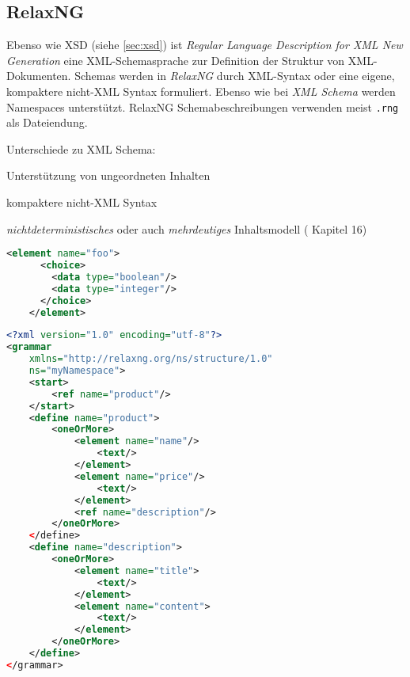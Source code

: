 \subsection{RelaxNG}
\label{sec:relaxng}

Ebenso wie XSD (siehe \cref{sec:xsd}) ist \emph{Regular Language Description for XML New Generation} eine XML-Schemasprache zur Definition der Struktur von XML-Dokumenten. Schemas werden in \emph{RelaxNG} durch XML-Syntax oder eine eigene, kompaktere nicht-XML Syntax formuliert. Ebenso wie bei \emph{XML Schema} werden Namespaces unterstützt. RelaxNG Schemabeschreibungen verwenden meist \texttt{.rng} als Dateiendung.

Unterschiede zu XML Schema:
\begin{compactitem}
    \item Unterstützung von ungeordneten Inhalten
    \item kompaktere nicht-XML Syntax
    \item \emph{nichtdeterministisches} oder auch \emph{mehrdeutiges} Inhaltsmodell (\cite{RelaxNGVlist} Kapitel 16)%
    \begin{lstlisting}[language=XML]
    <element name="foo">
      <choice>
        <data type="boolean"/>
        <data type="integer"/>
      </choice>
    </element>
    \end{lstlisting}
\end{compactitem}

\begin{lstlisting}[language=XML, caption=Minimalbeispiel für eine Schemadefinition in RelaxNG, label=minimalRelaxNG]
<?xml version="1.0" encoding="utf-8"?>
<grammar 
    xmlns="http://relaxng.org/ns/structure/1.0"
    ns="myNamespace">
    <start>
        <ref name="product"/>
    </start>
    <define name="product">
        <oneOrMore>
            <element name="name"/>
                <text/>
            </element>
            <element name="price"/>
                <text/>
            </element>
            <ref name="description"/>
        </oneOrMore>
    </define>
    <define name="description">
        <oneOrMore>
            <element name="title">
                <text/>
            </element>
            <element name="content">
                <text/>
            </element>
        </oneOrMore>
    </define>
</grammar>
\end{lstlisting}
